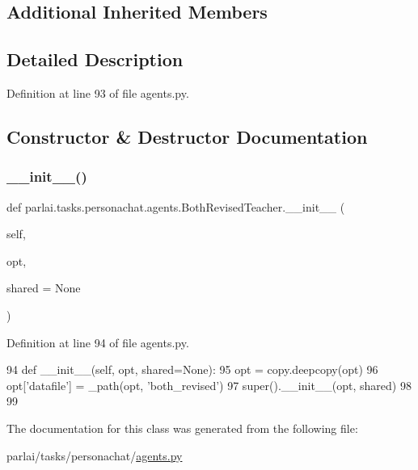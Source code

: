 \subsection*{Additional Inherited Members}


\subsection{Detailed Description}


Definition at line 93 of file agents.\+py.



\subsection{Constructor \& Destructor Documentation}
\mbox{\label{classparlai_1_1tasks_1_1personachat_1_1agents_1_1BothRevisedTeacher_ad79201b85afa5bfebc40d962550493f8}} 
\subsubsection{\texorpdfstring{\+\_\+\+\_\+init\+\_\+\+\_\+()}{\_\_init\_\_()}}
{\footnotesize\ttfamily def parlai.\+tasks.\+personachat.\+agents.\+Both\+Revised\+Teacher.\+\_\+\+\_\+init\+\_\+\+\_\+ (\begin{DoxyParamCaption}\item[{}]{self,  }\item[{}]{opt,  }\item[{}]{shared = {\ttfamily None} }\end{DoxyParamCaption})}



Definition at line 94 of file agents.\+py.


\begin{DoxyCode}
94     \textcolor{keyword}{def }\_\_init\_\_(self, opt, shared=None):
95         opt = copy.deepcopy(opt)
96         opt[\textcolor{stringliteral}{'datafile'}] = \_path(opt, \textcolor{stringliteral}{'both\_revised'})
97         super().\_\_init\_\_(opt, shared)
98 
99 
\end{DoxyCode}


The documentation for this class was generated from the following file\+:\begin{DoxyCompactItemize}
\item 
parlai/tasks/personachat/\hyperlink{parlai_2tasks_2personachat_2agents_8py}{agents.\+py}\end{DoxyCompactItemize}
